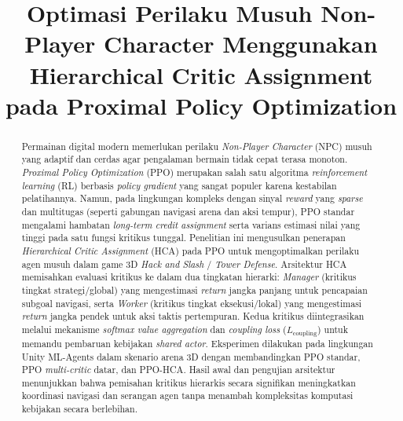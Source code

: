 \documentclass[conference]{IEEEtran}
\begin{document}
\title{Optimasi Perilaku Musuh Non-Player Character Menggunakan Hierarchical Critic Assignment pada Proximal Policy Optimization}

\author{
\and
{}
}

\maketitle

\begin{abstract}
Permainan digital modern memerlukan perilaku \textit{Non-Player Character} (NPC) musuh yang adaptif dan cerdas agar pengalaman bermain tidak cepat terasa monoton. \textit{Proximal Policy Optimization} (PPO) merupakan salah satu algoritma \textit{reinforcement learning} (RL) berbasis \textit{policy gradient} yang sangat populer karena kestabilan pelatihannya. Namun, pada lingkungan kompleks dengan sinyal \textit{reward} yang \textit{sparse} dan multitugas (seperti gabungan navigasi arena dan aksi tempur), PPO standar mengalami hambatan \textit{long-term credit assignment} serta varians estimasi nilai yang tinggi pada satu fungsi kritikus tunggal. Penelitian ini mengusulkan penerapan \textit{Hierarchical Critic Assignment} (HCA) pada PPO untuk mengoptimalkan perilaku agen musuh dalam game 3D \textit{Hack and Slash} / \textit{Tower Defense}. Arsitektur HCA memisahkan evaluasi kritikus ke dalam dua tingkatan hierarki: \textit{Manager} (kritikus tingkat strategi/global) yang mengestimasi \textit{return} jangka panjang untuk pencapaian subgoal navigasi, serta \textit{Worker} (kritikus tingkat eksekusi/lokal) yang mengestimasi \textit{return} jangka pendek untuk aksi taktis pertempuran. Kedua kritikus diintegrasikan melalui mekanisme \textit{softmax value aggregation} dan \textit{coupling loss} (\(L_{\text{coupling}}\)) untuk memandu pembaruan kebijakan \textit{shared actor}. Eksperimen dilakukan pada lingkungan Unity ML-Agents dalam skenario arena 3D dengan membandingkan PPO standar, PPO \textit{multi-critic} datar, dan PPO-HCA. Hasil awal dan pengujian arsitektur menunjukkan bahwa pemisahan kritikus hierarkis secara signifikan meningkatkan koordinasi navigasi dan serangan agen tanpa menambah kompleksitas komputasi kebijakan secara berlebihan.
\end{abstract}
\end{document}
